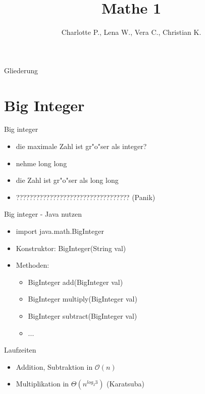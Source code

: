 \documentclass[18pt]{beamer}
\title[Mathe 1]{Mathe 1}
\author{Charlotte P., Lena W., Vera C., Christian K.}
\institute{ITI Wagner \& IPD Tichy}
\begin{document}

\begin{frame}
\titlepage
\end{frame}

\begin{frame}{Gliederung}
\tableofcontents
\end{frame}

\section {Big Integer}
\begin{frame}{Big integer}
\begin {itemize}
\item die maximale Zahl ist gr"o"ser als integer?
 
\item nehme long long

\item die Zahl ist gr"o"ser als long long
 
\item ?????????????????????????????????? (Panik) 
\end {itemize}
\end{frame}

\begin{frame}{Big integer - Java nutzen}
\begin {itemize}
\item import java.math.BigInteger
\item Konstruktor: BigInteger(String val)
\item Methoden:
\begin {itemize}
\item BigInteger add(BigInteger val)
\item BigInteger multiply(BigInteger val)
\item BigInteger subtract(BigInteger val)
\item ...
\end {itemize}
\end {itemize}
\end{frame}

\begin{frame} {Laufzeiten}
\begin {itemize}
\item Addition, Subtraktion in $\mathcal{O}(n)$
\item Multiplikation in $\Theta(n^{log_{2}3})$ (Karatsuba)
\end {itemize}
\end{frame}
\end{document}
